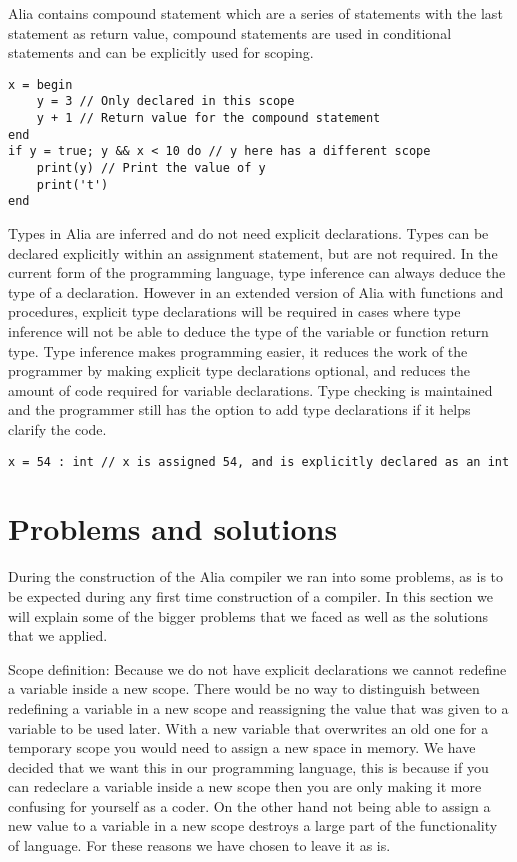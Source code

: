 \documentclass[paper=a4, fontsize=11pt]{article}
\numberwithin{equation}{section}		%
\numberwithin{figure}{section}			%
\numberwithin{table}{section}				%
\begin{document}
Alia contains compound statement which are a series of statements with the last statement as return value, compound statements are used in conditional statements and can be explicitly used for scoping.

\begin{lstlisting}
x = begin
    y = 3 // Only declared in this scope
    y + 1 // Return value for the compound statement
end
if y = true; y && x < 10 do // y here has a different scope
    print(y) // Print the value of y
    print('t')
end
\end{lstlisting}

Types in Alia are inferred and do not need explicit declarations. Types can be declared explicitly within an assignment statement, but are not required. In the current form of the programming language, type inference can always deduce the type of a declaration. However in an extended version of Alia with functions and procedures, explicit type declarations will be required in cases where type inference will not be able to deduce the type of the variable or function return type. Type inference makes programming easier, it reduces the work of the programmer by making explicit type declarations optional, and reduces the amount of code required for variable declarations. Type checking is maintained and the programmer still has the option to add type declarations if it helps clarify the code.

\begin{lstlisting}
x = 54 : int // x is assigned 54, and is explicitly declared as an int
\end{lstlisting}



\section{Problems and solutions}
During the construction of the Alia compiler we ran into some problems, as is to be expected during any first time construction of a compiler. In this section we will explain some of the bigger problems that we faced as well as the solutions that we applied.

Scope definition: Because we do not have explicit declarations we cannot redefine a variable inside a new scope. There would be no way to distinguish between redefining a variable in a new scope and reassigning the value that was given to a variable to be used later. With a new variable that overwrites an old one for a temporary scope you would need to assign a new space in memory. We have decided that we want this in our programming language, this is because if you can redeclare a variable inside a new scope then you are only making it more confusing for yourself as a coder. On the other hand not being able to assign a new value to a variable in a new scope destroys a large part of the functionality of language. For these reasons we have chosen to leave it as is.
\end{document}
